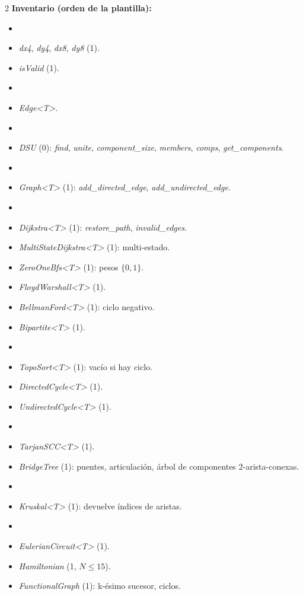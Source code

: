 \documentclass[10pt]{article}
\begin{document}
\begin{multicols}{2}
\textbf{Inventario (orden de la plantilla):}
\begin{itemize}\setlength{\itemsep}{1pt}
  \item[\textbf{Grillas}]
  \item \textit{dx4}, \textit{dy4}, \textit{dx8}, \textit{dy8} (1).
  \item \textit{isValid} (1).
  \item[\textbf{Internas}]
  \item \textit{Edge<T>}.
  \item[\textbf{Conjuntos}]
  \item \textit{DSU} (0): \textit{find}, \textit{unite}, \textit{component\_size}, \textit{members}, \textit{comps}, \textit{get\_components}.
  \item[\textbf{Estructura}]
  \item \textit{Graph<T>} (1): \textit{add\_directed\_edge}, \textit{add\_undirected\_edge}.
  \item[\textbf{Caminos mínimos}]
  \item \textit{Dijkstra<T>} (1): \textit{restore\_path}, \textit{invalid\_edges}.
  \item \textit{MultiStateDijkstra<T>} (1): multi-estado.
  \item \textit{ZeroOneBfs<T>} (1): pesos $\{0,1\}$.
  \item \textit{FloydWarshall<T>} (1).
  \item \textit{BellmanFord<T>} (1): ciclo negativo.
  \item \textit{Bipartite<T>} (1).
  \item[\textbf{Orden}]
  \item \textit{TopoSort<T>} (1): vacío si hay ciclo.
  \item \textit{DirectedCycle<T>} (1).
  \item \textit{UndirectedCycle<T>} (1).
  \item[\textbf{Componentes}]
  \item \textit{TarjanSCC<T>} (1).
  \item \textit{BridgeTree} (1): puentes, articulación, árbol de componentes 2-arista-conexas.
  \item[\textbf{MST}]
  \item \textit{Kruskal<T>} (1): devuelve índices de aristas.
  \item[\textbf{Caminos especiales}]
  \item \textit{EulerianCircuit<T>} (1).
  \item \textit{Hamiltonian} (1, $N \le 15$).
  \item \textit{FunctionalGraph} (1): k-ésimo sucesor, ciclos.

\end{itemize}
\end{multicols}
\end{document}
